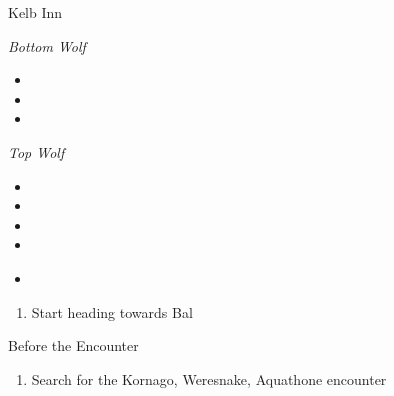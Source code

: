 \begin{paracol}{2}
\begin{shop}{Kelb Inn}
    \varwb
    \begin{buy}
        \item \textit{Bottom Wolf}
        \begin{itemize}
            \item {} \speedDrink \space {}
            \item {} \heroDrink \space {}
            \item {} \revivify \space {}
        \end{itemize}
        \item \textit{Top Wolf}
        \item \begin{itemize}
            \item {} \hiPotion \space {}
            \item {} \antidote \space {}
            \item {} \eyedrop \space {}
            \item {} \maidensKiss \space {}
        \end{itemize}
    \end{buy}
    \begin{itemize}
        \item {}
    \end{itemize}
    \varwe
\end{shop}

\begin{enumerate}[resume]
    \item Start heading towards Bal
\end{enumerate}

\begin{menu}{Before the Encounter}
    \varwb
    \begin{itemMenu}
        \antidoteMenu {}
        \hiPotionMenu {}
    \end{itemMenu}
    \varwe
\end{menu}

\begin{enumerate}[resume]
    \item Search for the Kornago, Weresnake, Aquathone encounter
\end{enumerate}


\end{paracol}
